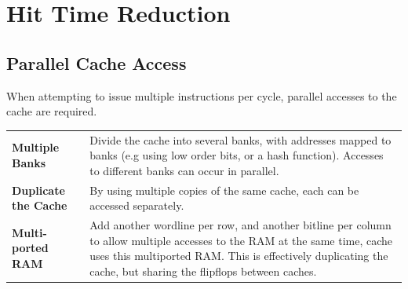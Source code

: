 \section{Hit Time Reduction}

\subsection{Parallel Cache Access}
When attempting to issue multiple instructions per cycle, parallel accesses to the cache are required.
\begin{center}
    \begin{tabular}{p{} p{}}
        \textbf{Multiple Banks} & Divide the cache into several banks, with addresses mapped to banks (e.g using low order bits, or a hash function). Accesses to different banks can occur in parallel. \\
        \textbf{Duplicate the Cache} & By using multiple copies of the same cache, each can be accessed separately. \\
        \textbf{Multi-ported RAM} & Add another wordline per row, and another bitline per column to allow multiple accesses to the RAM at the same time, cache uses this multiported RAM. This is effectively duplicating the cache, but sharing the flipflops between caches. \\
    \end{tabular}
\end{center}


